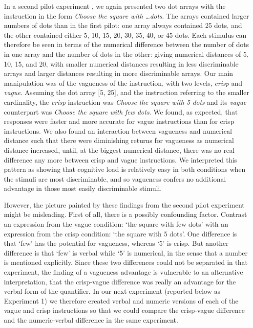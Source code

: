 In a second pilot experiment \citep{green2013utility}, we again presented two dot arrays with the instruction in the form \emph{Choose the square with \ldots dots}. The arrays contained larger numbers of dots than in the first pilot: one array always contained 25 dots, and the other contained either 5, 10, 15, 20, 30, 35, 40, or 45 dots. Each stimulus can therefore be seen in terms of the numerical difference between the number of dots in one array and the number of dots in the other: giving numerical distances of 5, 10, 15, and 20, with smaller numerical distances resulting in less discriminable arrays and larger distances resulting in more discriminable arrays. Our main manipulation was of the vagueness of the instruction, with two levels, \emph{crisp} and \emph{vague}. Assuming the dot array [5, 25], and the instruction referring to the smaller cardinality, the \emph{crisp} instruction was \emph{Choose the square with 5 dots} and its \emph{vague} counterpart was \emph{Choose the square with few dots}. We found, as expected, that responses were faster and more accurate for vague instructions than for crisp instructions. We also found an interaction between vagueness and numerical distance such that there were diminishing returns for vagueness as numerical distance increased, until, at the biggest numerical distance, there was no real difference any more between crisp and vague instructions. We interpreted this pattern as showing that cognitive load is relatively easy in both conditions when the stimuli are most discriminable, and so vagueness confers no additional advantage in those most easily discriminable stimuli.

However, the picture painted by these findings from the second pilot experiment might be misleading. First of all, there is a possibly confounding factor. Contrast an expression from the vague condition: `the square with few dots' with an expression from the crisp condition: `the square with 5 dots'. One difference is that `few' has the potential for vagueness, whereas `5' is crisp. But another difference is that `few' is verbal while `5' is numerical, in the sense that a number is mentioned explicitly. Since these two differences could not be separated in that experiment, the finding of a vagueness advantage is vulnerable to an alternative interpretation, that the crisp-vague difference was really an advantage for the verbal form of the quantifier. In our next experiment (reported below as Experiment 1) we therefore created verbal and numeric versions of each of the vague and crisp instructions so that we could compare the crisp-vague difference and the numeric-verbal difference in the same experiment.

